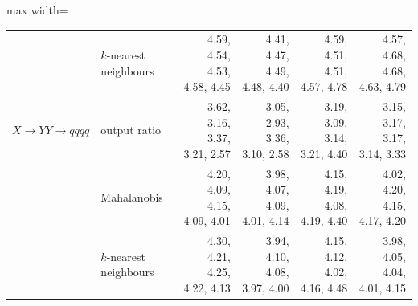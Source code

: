 \begin{table}[t]
\begin{adjustbox}{max width=\linewidth}
\begin{tabular}{l l rrrr}
 & $k$-nearest neighbours & 4.59, 4.54, 4.53, 4.58, 4.45 & 4.41, 4.47, 4.49, 4.48, 4.40 & 4.59, 4.51, 4.51, 4.57, 4.78 & 4.57, 4.68, 4.68, 4.63, 4.79 \\
\addlinespace
$X\to YY\to qqqq$ & output ratio & 3.62, 3.16, 3.37, 3.21, 2.57 & 3.05, 2.93, 3.36, 3.10, 2.58 & 3.19, 3.09, 3.14, 3.21, 4.40 & 3.15, 3.17, 3.17, 3.14, 3.33 \\
 & Mahalanobis & 4.20, 4.09, 4.15, 4.09, 4.01 & 3.98, 4.07, 4.09, 4.01, 4.14 & 4.15, 4.19, 4.08, 4.19, 4.40 & 4.02, 4.20, 4.15, 4.17, 4.20 \\
 & $k$-nearest neighbours & 4.30, 4.21, 4.25, 4.22, 4.13 & 3.94, 4.10, 4.08, 3.97, 4.00 & 4.15, 4.12, 4.02, 4.16, 4.48 & 3.98, 4.05, 4.04, 4.01, 4.15 \\
\bottomrule
\end{tabular}
\end{adjustbox}
\end{table}
